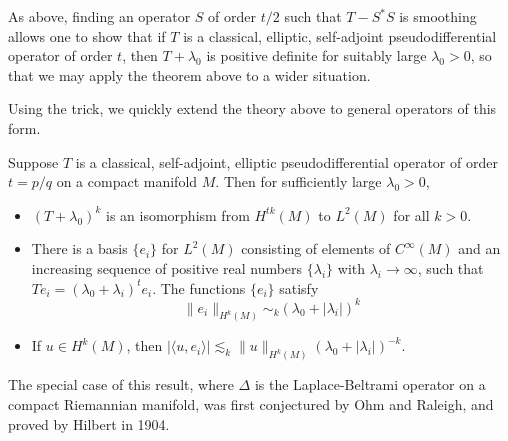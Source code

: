 \begin{remark}
    As above, finding an operator $S$ of order $t/2$ such that $T - S^*S$ is smoothing allows one to show that if $T$ is a classical, elliptic, self-adjoint pseudodifferential operator of order $t$, then $T + \lambda_0$ is positive definite for suitably large $\lambda_0 > 0$, so that we may apply the theorem above to a wider situation.
\end{remark}

Using the trick, we quickly extend the theory above to general operators of this form.

\begin{theorem}
    Suppose $T$ is a classical, self-adjoint, elliptic pseudodifferential operator of order $t = p/q$ on a compact manifold $M$. Then for sufficiently large $\lambda_0 > 0$,
    \begin{itemize}
        \item $(T + \lambda_0)^k$ is an isomorphism from $H^{tk}(M)$ to $L^2(M)$ for all $k > 0$.
        \item There is a basis $\{ e_i \}$ for $L^2(M)$ consisting of elements of $C^\infty(M)$ and an increasing sequence of positive real numbers $\{ \lambda_i \}$ with $\lambda_i \to \infty$, such that $Te_i = (\lambda_0 + \lambda_i)^t e_i$. The functions $\{ e_i \}$ satisfy
        \[ \| e_i \|_{H^k(M)} \sim_k (\lambda_0 + |\lambda_i|)^k \]
        \item If $u \in H^k(M)$, then $|\langle u, e_i \rangle| \lesssim_k \| u \|_{H^k(M)} (\lambda_0 + |\lambda_i|)^{-k}$.
    \end{itemize}
\end{theorem}

The special case of this result, where $\Delta$ is the Laplace-Beltrami operator on a compact Riemannian manifold, was first conjectured by Ohm and Raleigh, and proved by Hilbert in 1904.

